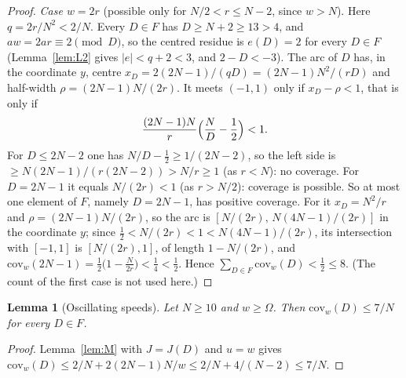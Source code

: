 \documentclass[11pt]{article}
\newtheorem{lemma}[theorem]{Lemma}
\theoremstyle{definition}
\theoremstyle{remark}
\begin{document}
\begin{proof}
\emph{Case $w=2r$} (possible only for $N/2<r\le N-2$, since $w>N$). Here $q=2r/N^2<2/N$. Every $D\in F$ has $D\ge N+2\ge13>4$, and $aw=2ar\equiv2\pmod D$, so the centred residue is $e(D)=2$ for every $D\in F$ (Lemma~\ref{lem:L2} gives $|e|<q+2<3$, and $2-D<-3$). The arc of $D$ has, in the coordinate $y$, centre $x_D=2(2N-1)/(qD)=(2N-1)N^2/(rD)$ and half-width $\rho=(2N-1)N/(2r)$. It meets $(-1,1)$ only if $x_D-\rho<1$, that is only if
\[
\frac{(2N-1)N}{r}\Bigl(\frac ND-\frac12\Bigr)<1.
\]
For $D\le2N-2$ one has $N/D-\frac12\ge1/(2N-2)$, so the left side is $\ge N(2N-1)/(r(2N-2))>N/r\ge1$ (as $r<N$): no coverage. For $D=2N-1$ it equals $N/(2r)<1$ (as $r>N/2$): coverage is possible. So at most one element of $F$, namely $D=2N-1$, has positive coverage. For it $x_D=N^2/r$ and $\rho=(2N-1)N/(2r)$, so the arc is $[N/(2r),\,N(4N-1)/(2r)]$ in the coordinate $y$; since $\frac12<N/(2r)<1<N(4N-1)/(2r)$, its intersection with $[-1,1]$ is $[N/(2r),1]$, of length $1-N/(2r)$, and $\mathrm{cov}_w(2N-1)=\frac12\bigl(1-\frac N{2r}\bigr)<\frac14<\frac12$. Hence $\sum_{D\in F}\mathrm{cov}_w(D)<\tfrac12\le8$. (The count of the first case is not used here.)
\end{proof}

\begin{lemma}[Oscillating speeds]\label{lem:L4}
Let $N\ge10$ and $w\ge\Omega$. Then $\mathrm{cov}_w(D)\le7/N$ for every $D\in F$.
\end{lemma}
\begin{proof}
Lemma~\ref{lem:M} with $J=J(D)$ and $u=w$ gives $\mathrm{cov}_w(D)\le2/N+2(2N-1)N/w\le2/N+4/(N-2)\le7/N$.
\end{proof}
\end{document}
